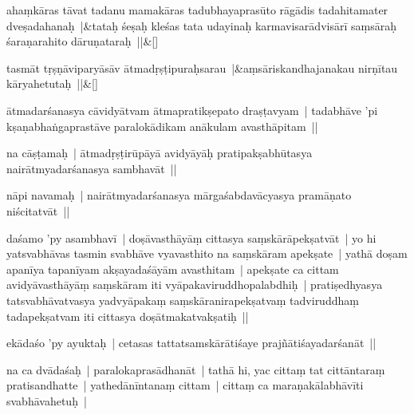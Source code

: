\documentclass[article,12pt,a4paper]{memoir}%
\newcounter{parCount}
\begin{document}
	    
	    \stanza[\smallbreak]
	  ahaṃkāras tāvat tadanu mamakāras tadubhayaprasūto rāgādis tadahitamater dveṣadahanaḥ |&tataḥ śeṣaḥ kleśas tata udayinaḥ karmavisarādvisārī saṃsāraḥ śaraṇarahito dāruṇataraḥ ||\&[\smallbreak]
	  
	  
	  
	    
	    \stanza[\smallbreak]
	  tasmāt tṛṣṇāviparyāsāv ātmadṛṣṭipuraḥsarau |&aṃsāriskandhajanakau nirṇītau kāryahetutaḥ ||\&[\smallbreak]
	  
	  
	  

	  \pstart \leavevmode%
	\label{thakur75-2.29}ātmadarśanasya cāvidyātvam ātmapratikṣepato draṣṭavyam | tadabhāve 'pi kṣaṇabhaṅgaprastāve paralokādikam anākulam avasthāpitam || 
	{}
	\pend%
      

	  \pstart \leavevmode%
	\label{thakur75-2.31}na cāṣṭamaḥ | ātmadṛṣṭirūpāyā avidyāyāḥ pratipakṣabhūtasya nairātmyadarśanasya sambhavāt || 
	{}
	\pend%
      

	  \pstart \leavevmode%
	\label{thakur75-3.1}nāpi navamaḥ | nairātmyadarśanasya mārgaśabdavācyasya pramāṇato niścitatvāt || 
	{}
	\pend%
      

	  \pstart \leavevmode%
	\label{thakur75-3.2}daśamo 'py asambhavī | doṣāvasthāyāṃ cittasya saṃskārāpekṣatvāt | yo hi yatsvabhāvas tasmin svabhāve vyavasthito na saṃskāram apekṣate | yathā doṣam apanīya tapanīyam akṣayadaśāyām avasthitam | apekṣate ca cittam avidyāvasthāyāṃ saṃskāram iti vyāpakaviruddhopalabdhiḥ | pratiṣedhyasya tatsvabhāvatvasya yadvyāpakaṃ saṃskāranirapekṣatvaṃ tadviruddhaṃ tadapekṣatvam iti cittasya doṣātmakatvakṣatiḥ || 
	{}
	\pend%
      

	  \pstart \leavevmode%
	\label{thakur75-3.7}ekādaśo 'py ayuktaḥ | cetasas tattatsamskārātiśaye prajñātiśayadarśanāt || 
	{}
	\pend%
      

	  \pstart \leavevmode%
	\label{thakur75-3.8}na ca dvādaśaḥ | paralokaprasādhanāt | tathā hi, yac cittaṃ tat cittāntaraṃ pratisandhatte | yathedānīntanaṃ cittam | cittaṃ ca maraṇakālabhāvīti svabhāvahetuḥ | 
	{}
	\pend%
      
\end{document}
